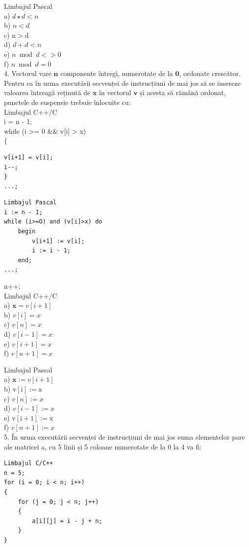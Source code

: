 \documentclass[10pt]{article}
\begin{document}
Limbajul Pascal\\
a) $d \star d<n$\\
b) $n<d$\\
c) $\mathrm{n}>\mathrm{d}$\\
d) $d+d<n$\\
e) $n \bmod d<>0$\\
f) $n \bmod d=0$\\
4. Vectorul vare $\mathbf{n}$ componente întregi, numerotate de la $\mathbf{0}$, ordonate crescător. Pentru ca în urma executării secvenței de instrucțiuni de mai jos să se insereze valoarea întreagă reținută de $\mathbf{x}$ în vectorul $\mathbf{v}$ și acesta să rămână ordonat, punctele de suspensie trebuie înlocuite cu:\\
Limbajul C++/C\\
i = n - 1;\\[0pt]
while (i >= 0 \&\& v[i] > x)\\
$\{$

\begin{verbatim}
v[i+1] = v[i];
i--;
}
...;
\end{verbatim}

\begin{verbatim}
Limbajul Pascal
i := n - 1;
while (i>=O) and (v[i]>x) do
    begin
        v[i+1] := v[i];
        i := i - 1;
    end;
...;
\end{verbatim}

n++;\\
Limbajul C++/C\\
a) $\mathbf{x}=v[i+1]$\\
b) $v[i]=x$\\
c) $v[n]=x$\\
d) $v[i-1]=x$\\
e) $v[i+1]=x$\\
f) $v[n+1]=x$

Limbajul Pascal\\
a) $\mathbf{x}:=v[i+1]$\\
b) $\mathrm{v}[\mathrm{i}]:=\mathrm{x}$\\
c) $v[n]:=x$\\
d) $v[i-1]:=x$\\
e) $\mathrm{v}[\mathrm{i}+1]:=\mathrm{x}$\\
f) $v[n+1]:=x$\\
5. În urma executării secvenței de instrucțiuni de mai jos suma elementelor pare ale matricei a, cu 5 linii și 5 coloane numerotate de la 0 la 4 va fi:

\begin{verbatim}
Limbajul C/C++
n = 5;
for (i = 0; i < n; i++)
{
    for (j = 0; j < n; j++)
    {
        a[i][j] = i - j + n;
    }
}
\end{verbatim}
\end{document}

